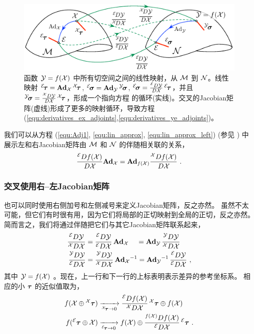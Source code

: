 \begin{figure}[tb]
\centering
\includegraphics{figures/jacobians_adjoints}
\caption{函数 $\cY=f(\cX)$ 中所有切空间之间的线性映射，从 $\cM$ 到 $\cN$。线性映射 ${{^\cE}\!\bftau=\Ad[\cM]{\cX}\,{^\cX}\!\bftau}$, ${{^\cE}\!\bfsigma=\Ad[\cN]{\cY}\,{^\cY}\!\bfsigma}$, ${{^\cE}\!\bfsigma=\ldpar{\cY}{\cX}\,{^\cE}\!\bftau}$，并且 ${{^\cY}\!\bfsigma=\rdpar{\cY}{\cX}\,{^\cX}\!\bftau}$，形成一个指向方程  的循环(实线)。交叉的Jacobian矩阵(虚线)形成了更多的映射循环，导致方程 (\ref{equ:derivatives_ex_adjoints},\ref{equ:derivatives_ye_adjoints})。} 
\label{fig:jacobians_adjoints}
\end{figure}

我们可以从方程 (\ref{equ:Adj1}, \ref{equ:lin_approx}, \ref{equ:lin_approx_left}) (参见 ) 中展示左和右Jacobian矩阵由 $\cM$ 和 $\cN$ 的伴随相关联的关系，
%
\begin{align}\label{equ:derivatives_lr_adjoints}
\ldpar{f(\cX)}{\cX}\Ad[\cM]{\cX} = \Ad[\cN]{f(\cX)}\rdpar{f(\cX)}{\cX} 
~.
\end{align}


\subsubsection{交叉使用右--左Jacobian矩阵}

也可以同时使用右侧加号和左侧减号来定义Jacobian矩阵，反之亦然。
虽然不太可能，但它们有时很有用，因为它们将局部的正切映射到全局的正切，反之亦然。
简而言之，我们将通过伴随把它们与其它Jacobian矩阵联系起来，
%
\begin{align}
\lrdpar{\cY}{\cX} &= \lldpar{\cY}{\cX}\,\Ad{\cX} ~~~\,= \Ad{\cY}\,\rrdpar{\cY}{\cX} \label{equ:derivatives_ex_adjoints}\\
\rldpar{\cY}{\cX} &= \rrdpar{\cY}{\cX}\,\Ad{\cX}\inv = \Ad{\cY}\inv\,\lldpar{\cY}{\cX}\label{equ:derivatives_ye_adjoints}
~,
\end{align}
%
其中 $\cY=f(\cX)$ 。现在，上一行和下一行的上标表明表示差异的参考坐标系。
相应的小 $\bftau$ 的近似值取为，
%
\begin{align}
f(\cX\op{^\cX}\bftau) 
  &\xrightarrow[{^\cX\!\bftau}\to0]{} \lrdpar{f(\cX)}{\cX}\,{^\cX}\bftau \op f(\cX) \label{equ:lin_approx_rl}\\
f({^\cE}\bftau\op\cX) 
  &\xrightarrow[{^\cE\!\bftau}\to0]{} f(\cX) \op \rldpar{f(\cX)}{\cX}\,{^\cE}\bftau \label{equ:lin_approx_lr}
  ~.
\end{align}



